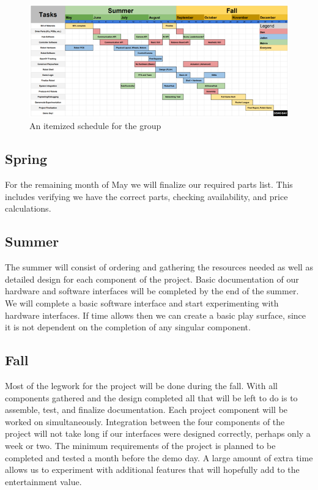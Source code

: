 \documentclass[11pt]{ieeeconf}
\begin{document}
 \begin{figure}[!t]
  \centering
  \captionsetup{justification=centering}
      \includegraphics[width=14cm]{images/schedule.png}
        \caption{An itemized schedule for the group}
        \label{schedule}
\end{figure}

\subsection{Spring}
For the remaining month of May we will finalize our required parts list. This includes verifying we have the correct parts, checking availability, and price calculations. 

\subsection{Summer}
The summer will consist of ordering and gathering the resources needed as well as detailed design for each component of the project. Basic documentation of our hardware and software interfaces will be completed by the end of the summer. We will complete a basic software interface and start experimenting with hardware interfaces. If time allows then we can create a basic play surface, since it is not dependent on the completion of any singular component.

\subsection{Fall}
Most of the legwork for the project will be done during the fall. With all components gathered and the design completed all that will be left to do is to assemble, test, and finalize documentation. Each project component will be worked on simultaneously. Integration between the four components of the project will not take long if our interfaces were designed correctly, perhaps only a week or two. The minimum requirements of the project is planned to be completed and tested a month before the demo day. A large amount of extra time allows us to experiment with additional features that will hopefully add to the entertainment value.
\end{document}
